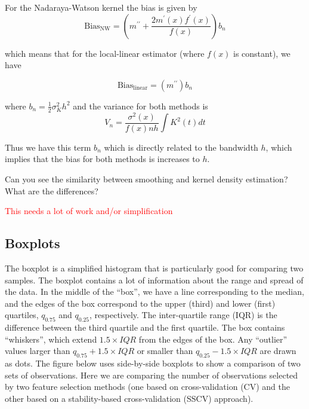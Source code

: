 For the Nadaraya-Watson kernel the bias is given by
$$\text{Bias}_{\text{NW}} = \left(m^{\prime \prime} + \frac{2 m^\prime(x) f^\prime(x)}{f(x)} \right) b_n$$ 

which means that for the local-linear estimator (where $f(x)$ is constant), we have

$$ \text{Bias}_{\text{linear}} = \left(m^{\prime \prime}\right) b_n$$

where $b_n = \frac12 \sigma_K^2 h^2$ and the variance for both methods is 
$$V_n = \frac{\sigma^2(x)}{f(x) n h } \int K^2(t) dt$$


Thus we have this term $b_n$ which is directly related to the bandwidth $h$, which implies that the bias for both methods is increases to $h$.

Can you see the similarity between smoothing and kernel density estimation? What are the differences?

\textcolor{red}{This needs a lot of work and/or simplification}


\subsection*{Boxplots}

The boxplot is a simplified histogram that is particularly good for comparing two samples. The boxplot contains a lot of information about the range and spread of the data. In the middle of the ``box'', we have a line corresponding to the median, and the edges of the box correspond to the upper (third) and lower (first) quartiles, $q_{0.75}$ and $q_{0.25}$, respectively. The inter-quartile range (IQR) is the difference between the third quartile and the first quartile. The box contains ``whiskers'', which extend $1.5 \times IQR$ from the edges of the box. Any ``outlier'' values larger than $q_{0.75} + 1.5 \times IQR$ or smaller than $q_{0.25} - 1.5 \times IQR$ are drawn as dots. The figure below uses side-by-side boxplots to show a comparison of two sets of observations. Here we are comparing the number of observations selected by two feature selection methods (one based on cross-validation (CV) and the other based on a stability-based cross-validation (SSCV) approach).


